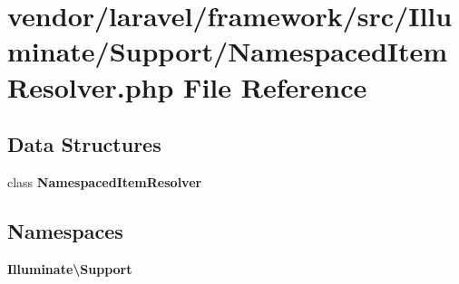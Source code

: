 \section{vendor/laravel/framework/src/\+Illuminate/\+Support/\+Namespaced\+Item\+Resolver.php File Reference}
\label{_namespaced_item_resolver_8php}
\subsection*{Data Structures}
\begin{DoxyCompactItemize}
\item 
class {\bf Namespaced\+Item\+Resolver}
\end{DoxyCompactItemize}
\subsection*{Namespaces}
\begin{DoxyCompactItemize}
\item 
 {\bf Illuminate\textbackslash{}\+Support}
\end{DoxyCompactItemize}

